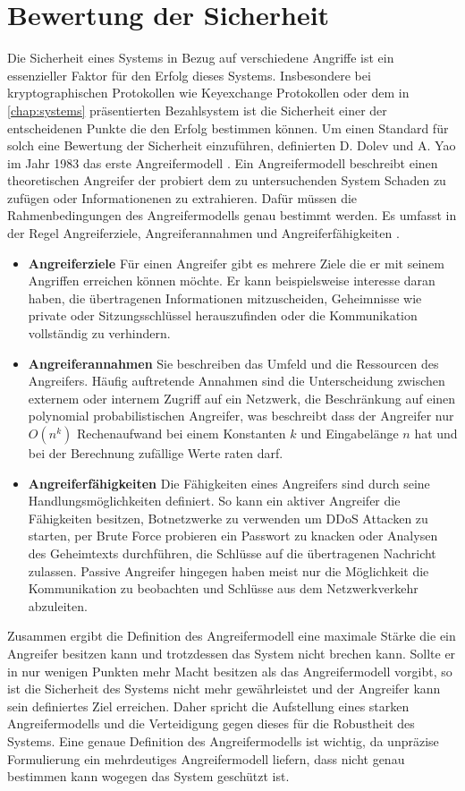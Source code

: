 \documentclass{scrreprt}
\begin{document}
\section{Bewertung der Sicherheit}
Die Sicherheit eines Systems in Bezug auf verschiedene Angriffe ist ein essenzieller Faktor für den Erfolg dieses Systems. Insbesondere bei kryptographischen Protokollen wie Keyexchange Protokollen oder dem in \ref{chap:systems} präsentierten Bezahlsystem ist die Sicherheit einer der entscheidenen Punkte die den Erfolg bestimmen können. Um einen Standard für solch eine Bewertung der Sicherheit einzuführen, definierten D. Dolev und A. Yao im Jahr 1983 das erste Angreifermodell \cite{am-dolev1983security}. Ein Angreifermodell beschreibt einen theoretischen Angreifer der probiert dem zu untersuchenden System Schaden zu zufügen oder Informationenen zu extrahieren. Dafür müssen die Rahmenbedingungen des Angreifermodells genau bestimmt werden. Es umfasst in der Regel Angreiferziele, Angreiferannahmen und Angreiferfähigkeiten \cite{am-do2019role}. 
\begin{itemize}
    \item \textbf{Angreiferziele} Für einen Angreifer gibt es mehrere Ziele die er mit seinem Angriffen erreichen können möchte. Er kann beispielsweise interesse daran haben, die übertragenen Informationen mitzuscheiden, Geheimnisse wie private oder Sitzungsschlüssel herauszufinden oder die Kommunikation vollständig zu verhindern. 
    \item \textbf{Angreiferannahmen} Sie beschreiben das Umfeld und die Ressourcen des Angreifers. Häufig auftretende Annahmen sind die Unterscheidung zwischen externem oder internem Zugriff auf ein Netzwerk, die Beschränkung auf einen polynomial probabilistischen Angreifer, was beschreibt dass der Angreifer nur $O(n^k)$ Rechenaufwand bei einem Konstanten $k$ und Eingabelänge $n$ hat und bei der Berechnung zufällige Werte raten darf.
    \item \textbf{Angreiferfähigkeiten} Die Fähigkeiten eines Angreifers sind durch seine Handlungsmöglichkeiten definiert. So kann ein aktiver Angreifer die Fähigkeiten besitzen, Botnetzwerke zu verwenden um DDoS Attacken zu starten, per Brute Force probieren ein Passwort zu knacken oder Analysen des Geheimtexts durchführen, die Schlüsse auf die übertragenen Nachricht zulassen. Passive Angreifer hingegen haben meist nur die Möglichkeit die Kommunikation zu beobachten und Schlüsse aus dem Netzwerkverkehr abzuleiten.
\end{itemize} 
Zusammen ergibt die Definition des Angreifermodell eine maximale Stärke die ein Angreifer besitzen kann und trotzdessen das System nicht brechen kann. Sollte er in nur wenigen Punkten mehr Macht besitzen als das Angreifermodell vorgibt, so ist die Sicherheit des Systems nicht mehr gewährleistet und der Angreifer kann sein definiertes Ziel erreichen. Daher spricht die Aufstellung eines starken Angreifermodells und die Verteidigung gegen dieses für die Robustheit des Systems. Eine genaue Definition des Angreifermodells ist wichtig, da unpräzise Formulierung ein mehrdeutiges Angreifermodell liefern, dass nicht genau bestimmen kann wogegen das System geschützt ist.
\end{document}
